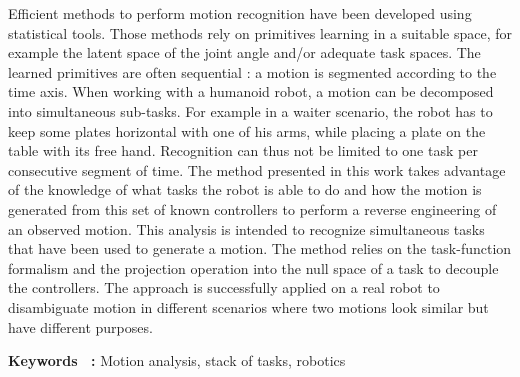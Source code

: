 {Efficient methods to perform motion recognition have been developed using statistical tools. Those methods rely on primitives learning in a suitable space, for example the latent space of the joint angle and/or adequate task spaces. The learned primitives are often sequential : a motion is segmented
according to the time axis. When working with a humanoid robot, a motion can be decomposed into simultaneous sub-tasks. For example in a waiter scenario, the robot has to keep some plates horizontal with one of his arms, while placing a plate on the table with its free hand. Recognition can thus not be
limited to one task per consecutive segment of time. The method presented in this work takes advantage of the knowledge of what tasks the robot is able to do and how the motion is generated from this set of known controllers to perform a reverse engineering of an observed motion. This analysis is intended to recognize simultaneous tasks that have been used to generate a motion. The method relies on the task-function formalism and the projection operation into the null space of a task to decouple the controllers. The approach is successfully applied on a real robot to disambiguate motion in different
scenarios where two motions look similar but have different purposes.

\medskip
\noindent 
\textbf{Keywords ~:} Motion analysis, stack of tasks, robotics

}
